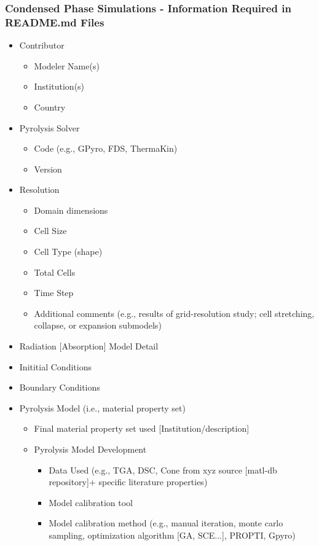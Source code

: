 \documentclass[12pt]{article}
\begin{document}
\subsubsection{Condensed Phase Simulations - Information Required in README.md Files}
\begin{itemize}[noitemsep]
 \item Contributor
 	\begin{itemize}[noitemsep]
	\item Modeler Name(s)
	\item Institution(s)
	\item Country
 	\end{itemize}
 \item Pyrolysis Solver
 	\begin{itemize}[noitemsep]
 	\item Code (e.g., GPyro, FDS, ThermaKin)
	\item Version
 	\end{itemize} 	
 \item Resolution
 	\begin{itemize}[noitemsep]
	\item Domain dimensions
 	\item Cell Size
	\item Cell Type (shape)
 	\item Total Cells
 	\item Time Step
 	\item Additional comments (e.g., results of grid-resolution study; cell stretching, collapse, or expansion submodels)
 	\end{itemize}
\item Radiation [Absorption] Model Detail
\item Inititial Conditions
\item Boundary Conditions
\item Pyrolysis Model (i.e., material property set) 
 		\begin{itemize}[noitemsep]
	 	\item Final material property set used [Institution/description]
	 		\item Pyrolysis Model Development
			\begin{itemize}[noitemsep]
	 		\item Data Used (e.g., TGA, DSC, Cone from xyz source [matl-db repository]+ specific literature properties)
	 		\item Model calibration tool
	 		\item Model calibration method (e.g., manual iteration, monte carlo sampling, optimization algorithm [GA, SCE...], PROPTI, Gpyro)

\end{itemize}
\end{itemize}
\end{itemize}
\end{document}
